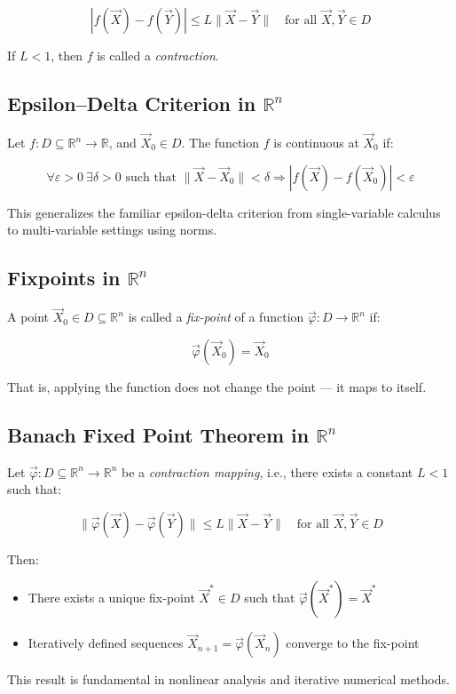 \[
|f(\vec{X}) - f(\vec{Y})| \le L \|\vec{X} - \vec{Y}\| \quad \text{for all } \vec{X}, \vec{Y} \in D
\]

If \( L < 1 \), then \( f \) is called a \emph{contraction}.



\subsection{Epsilon–Delta Criterion in \( \mathbb{R}^n \)}

Let \( f : D \subseteq \mathbb{R}^n \to \mathbb{R} \), and \( \vec{X}_0 \in D \). The function \( f \) is continuous at \( \vec{X}_0 \) if:

\[
\forall \varepsilon > 0 \ \exists \delta > 0 \text{ such that } \|\vec{X} - \vec{X}_0\| < \delta \Rightarrow |f(\vec{X}) - f(\vec{X}_0)| < \varepsilon
\]

This generalizes the familiar epsilon-delta criterion from single-variable calculus to multi-variable settings using norms.



\subsection{Fixpoints in \( \mathbb{R}^n \)}
  
A point \( \vec{X}_0 \in D \subseteq \mathbb{R}^n \) is called a \emph{fix-point} of a function \( \vec{\varphi} : D \to \mathbb{R}^n \) if:

\[
\vec{\varphi}(\vec{X}_0) = \vec{X}_0
\]

That is, applying the function does not change the point — it maps to itself.



\subsection{Banach Fixed Point Theorem in \( \mathbb{R}^n \)}

Let \( \vec{\varphi} : D \subseteq \mathbb{R}^n \to \mathbb{R}^n \) be a \emph{contraction mapping}, i.e., there exists a constant \( L < 1 \) such that:

\[
\|\vec{\varphi}(\vec{X}) - \vec{\varphi}(\vec{Y})\| \le L \|\vec{X} - \vec{Y}\| \quad \text{for all } \vec{X}, \vec{Y} \in D
\]

Then:
\begin{itemize}[label=\(-\)]
\item There exists a unique fix-point \( \vec{X}^* \in D \) such that \( \vec{\varphi}(\vec{X}^*) = \vec{X}^* \)
\item Iteratively defined sequences \( \vec{X}_{n+1} = \vec{\varphi}(\vec{X}_n) \) converge to the fix-point
\end{itemize}

This result is fundamental in nonlinear analysis and iterative numerical methods.



\newpage